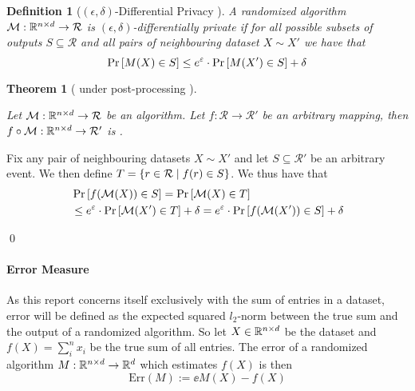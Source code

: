 \documentclass[a4paper,12pt]{article}
\renewenvironment{proof}{{\textit{Proof} \\}}{\qed}
\newtheorem{definition}{Definition}[section]
\newtheorem{theorem}{Theorem}
\begin{document}
\vspace*{0.3cm}
\begin{definition}[$(\epsilon, \delta)$-Differential Privacy \cite{dwork2016}]

A randomized algorithm $\mathcal{M}: \mathbb{R}^{n \times d} \rightarrow \mathcal{R}$ 
is $(\epsilon, \delta)$-differentially private if for all possible 
subsets of outputs $S \subseteq \mathcal{R}$ and all pairs of 
neighbouring dataset $X \sim X'$ we have that
\[ \Pr\left [M(X) \in S \right] \le e^{\varepsilon} \cdot \Pr\left [M(X') \in S \right] + \delta \]

\end{definition}

\begin{theorem}[ \edp under post-processing \cite{dpbasic}] %
\label{theo:PostProc}

Let $\mathcal{M}: \mathbb{R}^{n \times d} \rightarrow \mathcal{R}$ be an \edp 
algorithm. Let $f: \mathcal{R} \rightarrow \mathcal{R}'$ 
be an arbitrary mapping, then 
$f \circ \mathcal{M}: \mathbb{R}^{n \times d} \rightarrow \mathcal{R}'$ is \edp.

\end{theorem}

\begin{proof}

Fix any pair of neighbouring datasets $X \sim X'$ and 
let $S \subseteq \mathcal{R}'$ be an arbitrary event. We then define 
$T = \left \{ r \in \mathcal{R} \; \text{\textbar} \; f(r) \in S\right\}$.
We thus have that
\begin{align*}
    &\Pr\left [f(\mathcal{M}(X)) \in S \right] = \Pr\left [\mathcal{M}(X) \in T \right] \\
    &\le e^{\varepsilon} \cdot \Pr\left [\mathcal{M}(X') \in T \right] + \delta = 
    e^{\varepsilon} \cdot \Pr\left [f(\mathcal{M}(X')) \in S \right] + \delta
\end{align*}
    
\end{proof}

    

\paragraph{Error Measure}
As this report concerns itself exclusively with the sum of entries 
in a dataset, error will be defined as the expected
squared $l_2$-norm between the true sum and 
the output of a randomized algorithm.
So let $X \in \mathbb{R}^{n \times d}$ be the dataset and
$f(X) = \sum_i^n x_i$ be the true sum of all entries. The error of a
randomized algorithm $M : \mathbb{R}^{n \times d} \rightarrow \mathbb{R}^d$
which estimates $f(X)$ is then 
\[
    \text{Err}(M) := \ee{M(X) - f(X)}
\]
\end{document}
